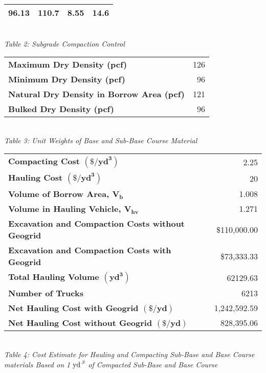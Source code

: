\documentclass{article}
\begin{document}
\begin{center}
\begin{tabular}{|c|c|c|c|}
        96.13 & 110.7 & 8.55 & 14.6 \\\hline 
    \end{tabular}
    \vspace{3mm}
    \emph{\\Table 2: Subgrade Compaction Control\\}
    \vspace{10mm}
    \begin{tabular}{|l|r|}
        \hline
        \textbf{Maximum Dry Density (pcf)}                & 126  \\
        \textbf{Minimum Dry Density (pcf)}                  & 96  \\
        \textbf{Natural Dry Density in Borrow Area (pcf)} & 121  \\
        \textbf{Bulked Dry Density (pcf)}                   & 96 \\\hline
    \end{tabular}
    \vspace{3mm}
    \emph{\\Table 3: Unit Weights of Base and Sub-Base Course Material}
    \newpage 
    \begin{tabular}{|l|r|}
        \hline
        \textbf{Compacting Cost $\left(\bm{\textbf{\$/yd}^3}\right)$}    & 2.25  \\
        \textbf{Hauling Cost $\left(\bm{\textbf{\$/yd}^3}\right)$}       & 20  \\
        \textbf{Volume of Borrow Area, $\bm{V_b}$}           & 1.008  \\
        \textbf{Volume in Hauling Vehicle, $\bm{V_{hv}}$}    & 1.271  \\
        \textbf{Excavation and Compaction Costs without Geogrid}          & \$110,000.00  \\
        \textbf{Excavation and Compaction Costs with Geogrid}          & \$73,333.33  \\
        \textbf{Total Hauling Volume $\left(\bm{\textbf{yd}^3}\right)$} & 62129.63  \\
        \textbf{Number of Trucks}                              & 6213  \\
        \textbf{Net Hauling Cost with Geogrid $\left(\bm{\textbf{\$/yd}}\right)$}     & 1,242,592.59  \\
        \textbf{Net Hauling Cost without Geogrid $\left(\bm{\textbf{\$/yd}}\right)$}     & 828,395.06  \\\hline
    \end{tabular}
    \vspace{3mm}
    \emph{\\Table 4: Cost Estimate for Hauling and Compacting Sub-Base and Base Course materials Based on 1 $\text{yd}^\emph{\,3}$ of Compacted Sub-Base and Base Course}
\end{center}
\newpage
\end{document}
